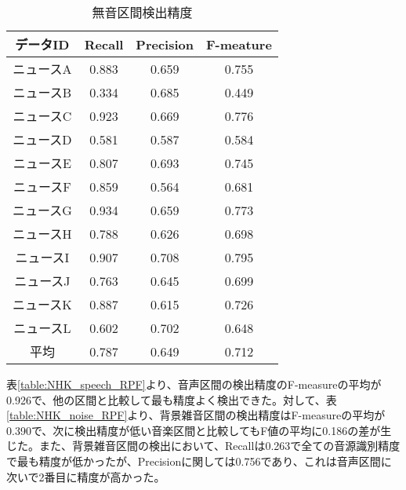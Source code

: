 \begin{table}[H]
  \begin{center}
    \caption{無音区間検出精度 \label{table:NHK_pause_RPF}}
    \begin{tabular}{|c||c|c|c|} \hline
データID & Recall & Precision & F-meature \\ \hline
ニュースA & 0.883 & 0.659 & 0.755 \\ \hline
ニュースB & 0.334 & 0.685 & 0.449 \\ \hline
ニュースC & 0.923 & 0.669 & 0.776 \\ \hline
ニュースD & 0.581 & 0.587 & 0.584 \\ \hline
ニュースE & 0.807 & 0.693 & 0.745 \\ \hline
ニュースF & 0.859 & 0.564 & 0.681 \\ \hline
ニュースG & 0.934 & 0.659 & 0.773 \\ \hline
ニュースH & 0.788 & 0.626 & 0.698 \\ \hline
ニュースI & 0.907 & 0.708 & 0.795 \\ \hline
ニュースJ & 0.763 & 0.645 & 0.699 \\ \hline
ニュースK & 0.887 & 0.615 & 0.726 \\ \hline
ニュースL & 0.602 & 0.702 & 0.648 \\ \hline
 平均 & 0.787 & 0.649 & 0.712 \\ \hline
    \end{tabular}
  \end{center}
\end{table}

表\ref{table:NHK_speech_RPF}より、音声区間の検出精度のF-measureの平均が0.926で、他の区間と比較して最も精度よく検出できた。対して、表\ref{table:NHK_noise_RPF}より、背景雑音区間の検出精度はF-measureの平均が0.390で、次に検出精度が低い音楽区間と比較してもF値の平均に0.186の差が生じた。また、背景雑音区間の検出において、Recallは0.263で全ての音源識別精度で最も精度が低かったが、Precisionに関しては0.756であり、これは音声区間に次いで2番目に精度が高かった。

